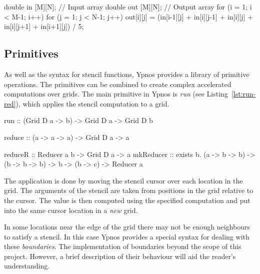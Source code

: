 \documentclass[
    12pt,
    a4paper,
    twoside,
    openright,
    ]{scrbook}
\begin{document}
\begin{hflisting}[label=lst:avgimp, caption={An imperative implementation of the
    average function. Note that the \texttt{in} index values have been laid out in the shape of the grid.}]
double in [M][N]; // Input array
double out [M][N]; // Output array
for (i = 1; i < M-1; i++){
  for (j = 1; j < N-1; j++){
    out[i][j] =
                 (in[i-1][j] +
     in[i][j-1] + in[i][j] + in[i][j+1]
                + in[i+1][j]) / 5;
  }
}
\end{hflisting}

\subsection{Primitives}
\label{sec:primitives}

As well as the syntax for stencil functions, Ypnos provides a library of
primitive operations. The primitives can be combined to create complex
accelerated computations over grids. The main primitive in Ypnos is \emph{run}
(see Listing~\ref{lst:run-red}), which applies the stencil computation to a
grid.

\begin{hflisting}[label={lst:run-red}, caption={The basic \texttt{run},
\texttt{reduce} and, \texttt{reduceR} primitive as defined in the original Ypnos
paper\cite{ypnos-damp10}. \texttt{reduceR} provides a more general version of
the reducer allowing for intermediary values.}]

run :: (Grid D a -> b) -> Grid D a -> Grid D b

reduce :: (a -> a -> a) -> Grid D a -> a

reduceR :: Reducer a b -> Grid D a -> a
mkReducer :: exists b. (a -> b -> b)
                    -> (b -> b -> b)
                    ->  b
                    -> (b -> c)
                    -> Reducer a
\end{hflisting}

The application is done by moving the stencil cursor over each location
in the grid. The arguments of the stencil are taken from positions in
the grid relative to the cursor. The value is then computed using the
specified computation and put into the same cursor location in a
\emph{new} grid.

In some locations near the edge of the grid there may not be enough neighbours
to satisfy a stencil. In this case Ypnos provides a special syntax for dealing
with these \emph{boundaries}. The implementation of boundaries beyond the scope
of this project. However, a brief description of their behaviour will aid the
reader's understanding.
\end{document}
